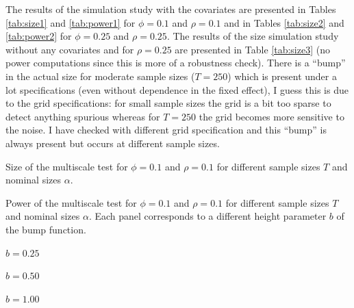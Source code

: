 \documentclass[a4paper,12pt]{article}
\begin{document}
\begin{enumerate}[label=\arabic*.,leftmargin=0.6cm]
{\begin{itemize}[topsep=0pt]
{\color{red} The results of the simulation study with the covariates are presented in Tables \ref{tab:size1} and \ref{tab:power1} for $\phi = 0.1$ and $\rho = 0.1$ and in Tables \ref{tab:size2} and \ref{tab:power2} for $\phi = 0.25$ and $\rho = 0.25$. The results of the size simulation study without any covariates and for $\rho = 0.25$ are presented in Table \ref{tab:size3} (no power computations since this is more of a robustness check). There is a ``bump'' in the actual size for moderate sample sizes ($T = 250$) which is present under a lot specifications (even without dependence in the fixed effect), I guess this is due to the grid specifications: for small sample sizes the grid is a bit too sparse to detect anything spurious whereas for $T=250$ the grid becomes more sensitive to the noise. I have checked with different grid specification and this ``bump'' is always present but occurs at different sample sizes.}

\begin{table}[t]
\footnotesize{
\begin{center}
\caption{Size of the multiscale test for $\phi = 0.1$ and $\rho = 0.1$ for different sample sizes $T$ and nominal sizes $\alpha$.}
\label{tab:size1}
\renewcommand{\arraystretch}{1.2}

\end{center}}
\footnotesize{
\begin{center}
\caption{Power of the multiscale test for $\phi = 0.1$ and $\rho = 0.1$ for different sample sizes $T$ and nominal sizes $\alpha$. Each panel corresponds to a different height parameter $b$ of the bump function.}\label{tab:power1}
\begin{subtable}[b]{0.32\textwidth}
\centering
\caption{$b = 0.25$}\label{tab:power1_025}
\renewcommand{\arraystretch}{1.2}

\end{subtable}
\begin{subtable}[b]{0.32\textwidth}
\centering
\caption{$b = 0.50$}\label{tab:power1_050}
\renewcommand{\arraystretch}{1.2}

\end{subtable}
\begin{subtable}[b]{0.32\textwidth}
\centering
\caption{$b = 1.00$}\label{tab:power1_100}
\renewcommand{\arraystretch}{1.2}

\end{subtable}
\end{center}}
\vspace{-0.4cm}
\end{table}


\end{itemize}}
\end{enumerate}
\end{document}
